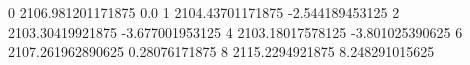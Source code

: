 0 2106.981201171875 0.0
1 2104.43701171875 -2.544189453125
2 2103.30419921875 -3.677001953125
4 2103.18017578125 -3.801025390625
6 2107.261962890625 0.28076171875
8 2115.2294921875 8.248291015625
